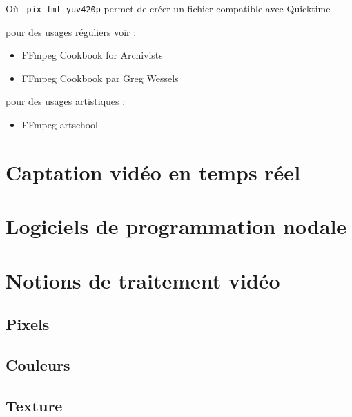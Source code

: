 \documentclass[
]{book}
\providecommand{\tightlist}{%
  \setlength{\itemsep}{0pt}\setlength{\parskip}{0pt}}
\begin{document}
Où \texttt{-pix\_fmt\ yuv420p} permet de créer un fichier compatible avec Quicktime

pour des usages réguliers voir :

\begin{itemize}
\tightlist
\item
  FFmpeg Cookbook for Archivists \citep{kromer_FFmpegCookbookArchivists_2020}
\item
  FFmpeg Cookbook par Greg Wessels \citep{wessels_FFmpegCookbook_2017}
\end{itemize}

pour des usages artistiques :

\begin{itemize}
\tightlist
\item
  FFmpeg artschool \citep{associationofmovingimagearchivists_FFmpegArtschool_2020}
\end{itemize}

\hypertarget{captation-viduxe9o-en-temps-ruxe9el}{%
\section{Captation vidéo en temps réel}\label{captation-viduxe9o-en-temps-ruxe9el}}

\hypertarget{logiciels-de-programmation-nodale}{%
\section{Logiciels de programmation nodale}\label{logiciels-de-programmation-nodale}}

\hypertarget{notions-de-traitement-viduxe9o}{%
\section{Notions de traitement vidéo}\label{notions-de-traitement-viduxe9o}}

\hypertarget{pixels}{%
\subsection{Pixels}\label{pixels}}

\hypertarget{couleurs}{%
\subsection{Couleurs}\label{couleurs}}

\hypertarget{texture}{%
\subsection{Texture}\label{texture}}
\end{document}
